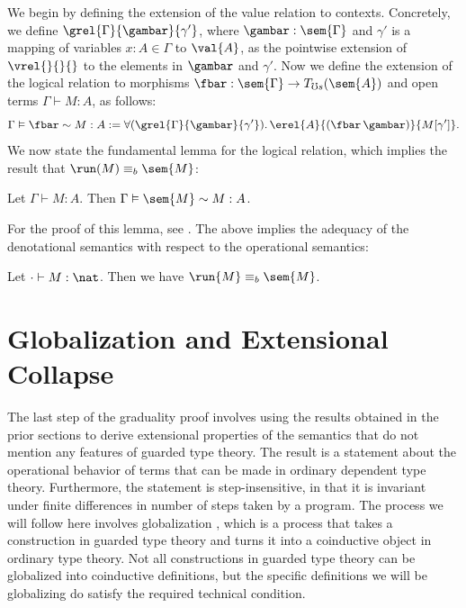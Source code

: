 \documentclass[acmsmall,screen,review,anonymous]{acmart}
\theoremstyle{remark}
\begin{document}
We begin by defining the extension of the value relation to contexts.
Concretely, we define $\grel{\Gamma}{\gambar}{\gamma'}$, where $\gambar :
\sem{\Gamma}$ and $\gamma'$ is a mapping of variables $x : A \in \Gamma$ to
$\val{A}$, as the pointwise extension of $\vrel{}{}{}$ to the elements in
$\gambar$ and $\gamma'$.
%
%
Now we define the extension of the logical relation to morphisms $\fbar :
\sem{\Gamma} \to T_{\mho s}(\sem{A})$ and open terms $\Gamma \vdash M : A$, as
follows:
\[ 
  \Gamma \vDash \fbar \sim M : A := 
    \forall (\grel{\Gamma} {\gambar} {\gamma'}).\,
      \erel{A} {(\fbar\, \gambar)} {M[\gamma']}.
\]
%
We now state the fundamental lemma for the logical relation, which implies the
result that $\run(M) \equiv_b \sem{M}$:
%
\begin{lemma}\label{lem:fundamental-lemma}
  Let $\Gamma \vdash M : A$. Then $\Gamma \vDash \sem{M} \sim M : A$.
\end{lemma}
%
For the proof of this lemma, see \citeappendix.
%
The above implies the adequacy of the denotational semantics with respect to the
operational semantics:
\begin{theorem}[Adequacy]
  Let $\cdot \vdash M : \nat$. Then we have $\run{M} \equiv_b \sem{M}$.
\end{theorem}



\section{Globalization and Extensional Collapse}\label{sec:globalization}

The last step of the graduality proof involves using the results obtained in the
prior sections to derive extensional properties of the semantics that do not
mention any features of guarded type theory. The result is a statement about the
operational behavior of terms that can be made in ordinary dependent type
theory. Furthermore, the statement is step-insensitive, in that it is invariant
under finite differences in number of steps taken by a program.
%
The process we will follow here involves globalization \cite{atkey-mcbride2013},
which is a process that takes a construction in guarded type theory and turns it
into a coinductive object in ordinary type theory. Not all constructions in
guarded type theory can be globalized into coinductive definitions, but the
specific definitions we will be globalizing do satisfy the required technical
condition.
\end{document}
